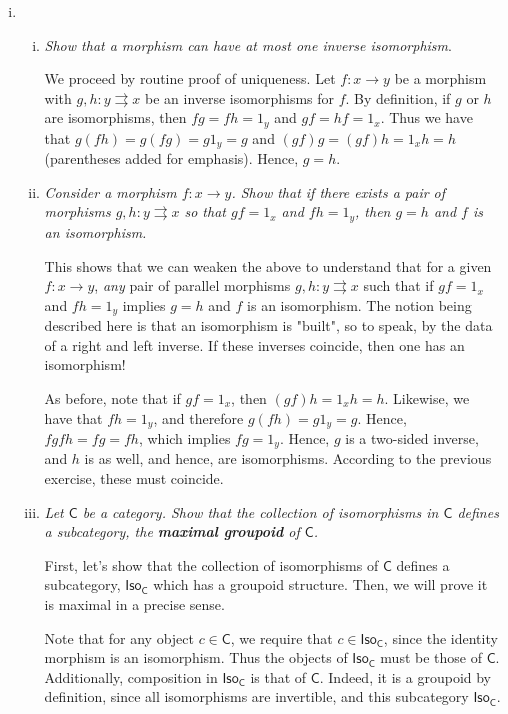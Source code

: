 \documentclass[10pt, oneside]{article}   	%
\newcommand{\cat}[1]{\bm{ \mathsf{#1} }}
\newcommand{\cc}{\cat{C}}
\newcommand{\subcat}[2]{\bm{ \mathsf{#1}}_{\bm{ \mathsf{#2}}}}
\begin{document}
\begin{enumerate}[i.]
\item 

\begin{enumerate}[(i)] 
\item \textit{Show that a morphism can have at most one inverse isomorphism}. 

We proceed by routine proof of uniqueness. Let $f : x \to y$ be a morphism with $g, h : y \rightrightarrows x$ be an inverse isomorphisms for $f$. By definition, if $g$ or $h$ are isomorphisms, then $fg = fh = 1_y$ and $gf = hf = 1_x$. Thus we have that 
$g(fh) = g(fg) = g1_y = g$ and $(gf)g = (gf)h = 1_xh = h$ (parentheses added for emphasis). Hence, $g = h$.

\item \textit{Consider a morphism $f : x \to y$. Show that if there exists a pair of morphisms $g, h: y \rightrightarrows x$ so that $gf = 1_x$ and $fh = 1_y$, then $g = h$ and $f$ is an isomorphism.}

This shows that we can weaken the above to understand that for a given $f: x \to y$, \textit{any} pair of parallel morphisms $g,h: y \rightrightarrows x$ such that if $gf = 1_x$ and $fh = 1_y$ implies $g = h$ and $f$ is an isomorphism. The notion being described here is that an isomorphism is "built", so to speak, by the data of a right and left inverse. If these inverses coincide, then one has an isomorphism! 

As before, note that if $gf = 1_x$, then $(gf)h = 1_x h = h$. Likewise, we have that $fh = 1_y$, and therefore $g(fh) = g1_y = g$. Hence, $fgfh = fg = fh$, which implies $fg = 1_y$. Hence, $g$ is a two-sided inverse, and $h$ is as well, and hence, are isomorphisms. According to the previous exercise, these must coincide.

\item \textit{Let $\cc$ be a category. Show that the collection of isomorphisms in $\cc$ defines a subcategory, the \textbf{maximal groupoid} of $\cc$.} 

First, let's show that the collection of isomorphisms of $\cc$ defines a subcategory, $\subcat{Iso}{C}$ which has a groupoid structure. Then, we will prove it is maximal in a precise sense. 

Note that for any object $c \in \cc$, we require that $c \in  \subcat{Iso}{C}$, since the identity morphism is an isomorphism. Thus the objects of $\subcat{Iso}{C}$ must be those of $\cc$. Additionally, composition in $\subcat{Iso}{C}$ is that of $\cc$. Indeed, it is a groupoid by definition, since all isomorphisms are invertible, and this subcategory $\subcat{Iso}{C}$.


\end{enumerate}
\end{enumerate}
\end{document}
